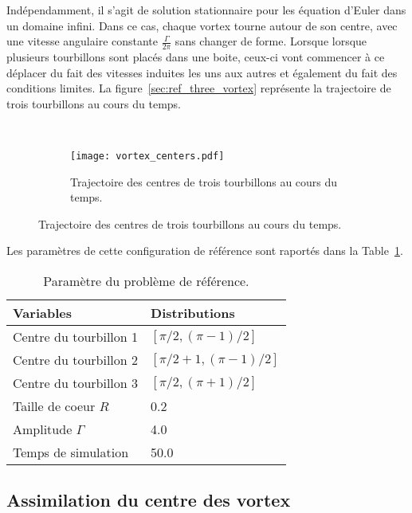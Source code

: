 Indépendamment, il s'agit de solution stationnaire pour les équation d'Euler dans un domaine infini. Dans ce cas, chaque vortex tourne autour de son centre, avec une vitesse angulaire constante $\frac{\Gamma}{2\pi}$ sans changer de forme. Lorsque lorsque plusieurs tourbillons sont placés dans une boite, ceux-ci vont commencer à ce déplacer du fait des vitesses induites les uns aux autres et également du fait des conditions limites. La figure~\ref{sec:ref_three_vortex} représente la trajectoire de trois tourbillons au cours du temps.

\begin{figure}~\label{sec:ref_three_vortex}
    \centering
    \begin{subfigure}{0.5\textwidth}
        \texttt{[image: vortex\_centers.pdf]}
        \caption{Trajectoire des centres de trois tourbillons au cours du temps.}
    \end{subfigure}
\end{figure}

Les paramètres de cette configuration de référence sont raportés dans la Table~\ref{tab:ref_three_vortex}.

\begin{table}[htbp]
    \centering
    \caption{Paramètre du problème de référence.}
    \begin{tabular}[t]{|l|l|}
        \hline
        Variables              & Distributions                 \\
        \hline
        Centre du tourbillon 1 & $[\pi / 2, (\pi - 1) /2]$     \\
        Centre du tourbillon 2 & $[\pi / 2 + 1, (\pi - 1)/ 2]$ \\
        Centre du tourbillon 3 & $[\pi / 2, (\pi + 1) / 2]$    \\
        Taille de coeur $R$    & 0.2                           \\
        Amplitude $\Gamma$     & 4.0                           \\
        Temps de simulation    & 50.0                          \\
        \hline
    \end{tabular}
    \label{tab:ref_three_vortex}
\end{table}

\subsection{Assimilation du centre des vortex}

